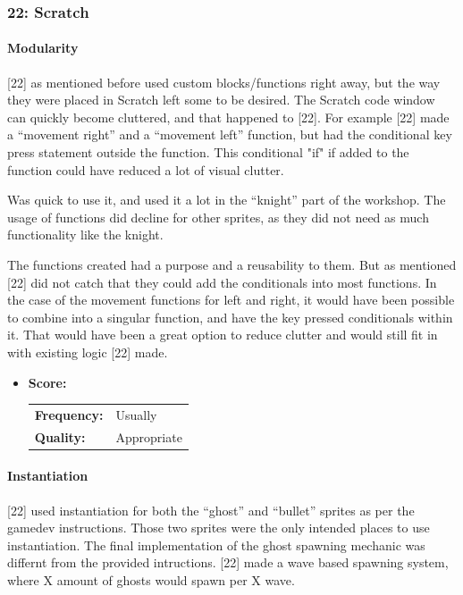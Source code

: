 \subsubsection{22: Scratch}

\paragraph{Modularity}

[22] as mentioned before used custom blocks/functions right away, but the way they were placed in Scratch left some to be desired.
The Scratch code window can quickly become cluttered, and that happened to [22].
For example [22] made a ``movement right'' and a ``movement left'' function, but had the conditional key press statement outside the function.
This conditional "if" if added to the function could have reduced a lot of visual clutter.

Was quick to use it, and used it a lot in the ``knight'' part of the workshop.
The usage of functions did decline for other sprites, as they did not need as much functionality like the knight.

The functions created had a purpose and a reusability to them.
But as mentioned [22] did not catch that they could add the conditionals into most functions.
In the case of the movement functions for left and right, it would have been possible to combine into a singular function, and have the key pressed conditionals within it.
That would have been a great option to reduce clutter and would still fit in with existing logic [22] made.



\begin{itemize}
    \item \textbf{Score:}
    \begin{tabular}{ll}
        \textbf{Frequency:} & Usually \\
        \textbf{Quality:}   & Appropriate \\
    \end{tabular}
\end{itemize}

\paragraph{Instantiation}

[22] used instantiation for both the ``ghost'' and ``bullet'' sprites as per the gamedev instructions.
Those two sprites were the only intended places to use instantiation. The final implementation of the ghost spawning mechanic was differnt from the provided intructions. [22] made a wave based spawning system, where X amount of ghosts would spawn per X wave.


